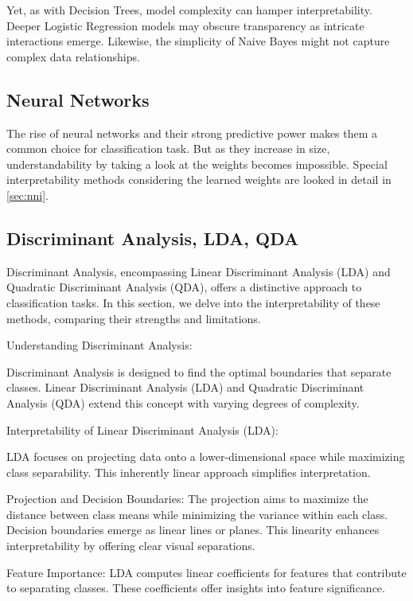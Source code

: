 Yet, as with Decision Trees, model complexity can hamper interpretability. Deeper Logistic Regression models may obscure transparency as intricate interactions emerge. Likewise, the simplicity of Naive Bayes might not capture complex data relationships.

\subsection{Neural Networks}

The rise of neural networks and their strong predictive power makes them a common choice for classification task. But as they increase in size, understandability by taking a look at the weights becomes impossible. Special interpretability methods considering the learned weights are looked in detail in \ref{sec:nni}.

\subsection{Discriminant Analysis, LDA, QDA}



Discriminant Analysis, encompassing Linear Discriminant Analysis (LDA) and Quadratic Discriminant Analysis (QDA), offers a distinctive approach to classification tasks. In this section, we delve into the interpretability of these methods, comparing their strengths and limitations.

Understanding Discriminant Analysis:

Discriminant Analysis is designed to find the optimal boundaries that separate classes. Linear Discriminant Analysis (LDA) and Quadratic Discriminant Analysis (QDA) extend this concept with varying degrees of complexity.

Interpretability of Linear Discriminant Analysis (LDA):

LDA focuses on projecting data onto a lower-dimensional space while maximizing class separability. This inherently linear approach simplifies interpretation.

Projection and Decision Boundaries: The projection aims to maximize the distance between class means while minimizing the variance within each class. Decision boundaries emerge as linear lines or planes. This linearity enhances interpretability by offering clear visual separations.

Feature Importance: LDA computes linear coefficients for features that contribute to separating classes. These coefficients offer insights into feature significance.

